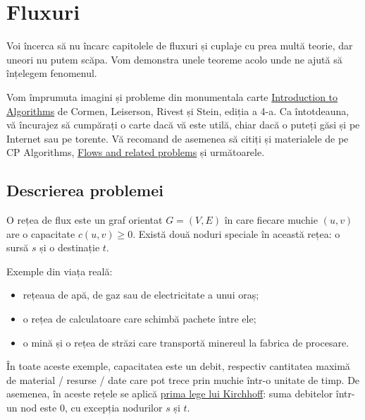 \documentclass[../main.tex]{subfiles}
\begin{document}
\chapter{Fluxuri}

Voi încerca să nu încarc capitolele de fluxuri și cuplaje cu prea multă teorie, dar uneori nu putem scăpa.  Vom demonstra unele teoreme acolo unde ne ajută să înțelegem fenomenul.

Vom împrumuta imagini și probleme din monumentala carte \href{https://github.com/Maria4lexzy/LeetCodeTraining/blob/main/Introduction.to.Algorithms.4th.Leiserson.Stein.Rivest.Cormen.MIT.Press.9780262046305.EBooksWorld.ir.pdf}{Introduction to Algorithms} de Cormen, Leiserson, Rivest și Stein, ediția a 4-a. Ca întotdeauna, vă încurajez să cumpărați o carte dacă vă este utilă, chiar dacă o puteți găsi și pe Internet sau pe torente. Vă recomand de asemenea să citiți și materialele de pe CP Algorithms, \href{https://cp-algorithms.com/graph/edmonds_karp.html}{Flows and related problems} și următoarele.

\section{Descrierea problemei}

\begin{definition}
  O rețea de flux este un graf orientat $G = (V,E)$ în care fiecare muchie $(u,v)$ are o capacitate $c(u, v) \geq 0$. Există două noduri speciale în această rețea: o sursă $s$ și o destinație $t$.
\end{definition}

Exemple din viața reală:

\begin{itemize}
  \item rețeaua de apă, de gaz sau de electricitate a unui oraș;
  \item o rețea de calculatoare care schimbă pachete între ele;
  \item o mină și o rețea de străzi care transportă minereul la fabrica de procesare.
\end{itemize}

În toate aceste exemple, capacitatea este un debit, respectiv cantitatea maximă de material / resurse / date care pot trece prin muchie într-o unitate de timp. De asemenea, în aceste rețele se aplică \href{https://en.wikipedia.org/wiki/Kirchhoff\%27s_circuit_laws#Kirchhoff's_current_law}{prima lege lui Kirchhoff}: suma debitelor într-un nod este 0, cu excepția nodurilor $s$ și $t$.
\end{document}
